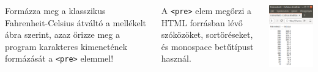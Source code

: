 \begin{frame}
  \begin{columns}[c]
      Formázza meg a klasszikus Fahrenheit-Celsius átváltó 
        
      a mellékelt ábra szerint, azaz őrizze meg a program karakteres kimenetének formázását 
      a \texttt{<pre>} elemmel!
      
      A \texttt{<pre>} elem megőrzi a HTML forrásban lévő szóközöket, sortöréseket, és monospace betűtípust használ.
      \begin{center}
        \begin{exampleblock}{}
          \centering \includegraphics[scale=.35]{fahrcels.png}
        \end{exampleblock}
      \end{center}
  \end{columns}
\end{frame}
